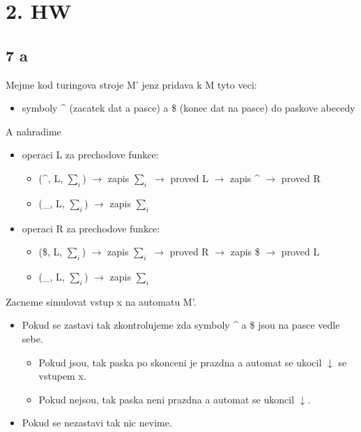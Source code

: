 \documentclass[a4paper]{article}
\begin{document}
\pagestyle{fancy}

\section*{2. HW}
\subsection*{7 a}

Mejme kod turingova stroje M' jenz pridava k M tyto veci:
\begin{itemize}
    \item symboly \^{} (zacatek dat a pasce) a \$ (konec dat na pasce) do paskove abecedy
\end{itemize}
A nahradime
\begin{itemize}
    \item operaci L za prechodove funkce:  
    \begin{itemize}
        \item (\^{}, L, $\sum_i$) $\rightarrow$ zapis $\sum_i$ $\rightarrow$ proved L $\rightarrow$  zapis \^{} $\rightarrow$  proved R  
        \item (\_, L, $\sum_i$) $\rightarrow$ zapis $\sum_i$  
    \end{itemize} 
    \item operaci R za prechodove funkce: 
    \begin{itemize}
        \item (\$, L, $\sum_i$) $\rightarrow$ zapis $\sum_i$ $\rightarrow$ proved R $\rightarrow$  zapis \$ $\rightarrow$  proved L 
        \item (\_, L, $\sum_i$) $\rightarrow$ zapis $\sum_i$  
    \end{itemize} 
\end{itemize}
    
Zacneme simulovat vstup x na automatu M'.
\begin{itemize}
    \item Pokud se zastavi tak zkontrolujeme zda symboly \^{} a \$ jsou na pasce vedle sebe.
    \begin{itemize}
        \item Pokud jsou, tak paska po skonceni je prazdna a automat se ukocil $\downarrow$ se vstupem x.
        \item Pokud nejsou, tak paska neni prazdna a automat se ukoncil $\downarrow$.
    \end{itemize}
    \item Pokud se nezastavi tak nic nevime.
\end{itemize}
\end{document}
